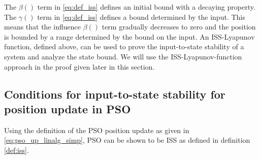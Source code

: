 The $ \beta () $ term in \eqref{eq:def_iss} defines an initial bound with a decaying property.
The $ \gamma () $ term in \eqref{eq:def_iss} defines a bound determined by the input.
This means that the influence $ \beta () $ term gradually decreases to zero and the position is bounded by a range determined by the bound on the input.
An ISS-Lyapunov function, defined above, can be used to prove the input-to-state stability of a system and analyze the state bound\cite{Jiang2001857}.
We will use the ISS-Lyapunov-function approach in the proof given later in this section.

\subsection{Conditions for input-to-state stability for position update in PSO}

Using the definition of the PSO position update as given in \eqref{eq:pso_up_linalg_simp}, PSO can be shown to be ISS as defined in definition \ref{def:iss}.

